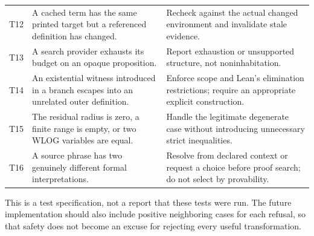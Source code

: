 \documentclass[11pt,a4paper]{article}
\theoremstyle{definition}
\theoremstyle{remark}
\numberwithin{equation}{section}
\begin{document}
\begin{longtable}{@{}P{.06\linewidth}P{.43\linewidth}P{.43\linewidth}@{}}
\addlinespace
T12 & A cached term has the same printed target but a referenced definition has changed. & Recheck against the actual changed environment and invalidate stale evidence. \\
\addlinespace
T13 & A search provider exhausts its budget on an opaque proposition. & Report exhaustion or unsupported structure, not noninhabitation. \\
\addlinespace
T14 & An existential witness introduced in a branch escapes into an unrelated outer definition. & Enforce scope and Lean's elimination restrictions; require an appropriate explicit construction. \\
\addlinespace
T15 & The residual radius is zero, a finite range is empty, or two WLOG variables are equal. & Handle the legitimate degenerate case without introducing unnecessary strict inequalities. \\
\addlinespace
T16 & A source phrase has two genuinely different formal interpretations. & Resolve from declared context or request a choice before proof search; do not select by provability. \\
\bottomrule
\end{longtable}
This is a test specification, not a report that these tests were run. The future implementation should also include positive neighboring cases for each refusal, so that safety does not become an excuse for rejecting every useful transformation.
\end{document}

